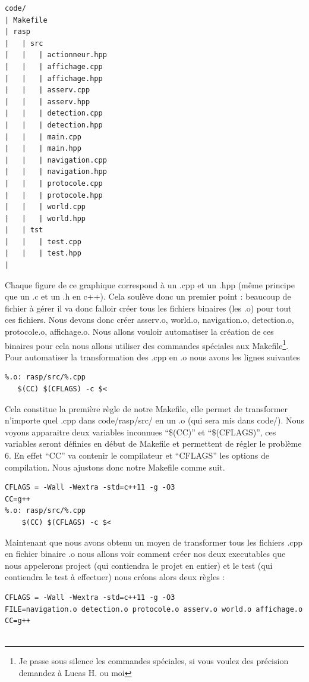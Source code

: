 \documentclass[a4paper,10pt]{article}
\begin{document}
\begin{spacing}{1.5}
\begin{multicols}{2}
  \columnbreak
\begin{verbatim}
code/
| Makefile
| rasp
|   | src
|   |   | actionneur.hpp
|   |   | affichage.cpp
|   |   | affichage.hpp
|   |   | asserv.cpp
|   |   | asserv.hpp
|   |   | detection.cpp
|   |   | detection.hpp
|   |   | main.cpp
|   |   | main.hpp
|   |   | navigation.cpp
|   |   | navigation.hpp
|   |   | protocole.cpp
|   |   | protocole.hpp
|   |   | world.cpp
|   |   | world.hpp
|   | tst
|   |   | test.cpp
|   |   | test.hpp
|
\end{verbatim}
\end{multicols}
Chaque figure de ce graphique correspond à un .cpp et un .hpp (même principe que
un .c et un .h en c++). Cela soulève donc un premier point : beaucoup de fichier
à gérer il va donc falloir créer tous les fichiers binaires (les .o) pour tout
ces fichiers. Nous devons donc créer asserv.o, world.o, navigation.o,
detection.o, protocole.o, affichage.o. Nous allons vouloir automatiser la
création de ces binaires pour cela nous allons utiliser des commandes spéciales
aux Makefile\footnote{Je passe sous silence les commandes spéciales, si vous
  voulez des précision demandez à Lucas H. ou moi}. Pour automatiser la
transformation des .cpp en .o nous avons les lignes suivantes
\begin{lstlisting}
%.o: rasp/src/%.cpp
   $(CC) $(CFLAGS) -c $<
\end{lstlisting}

Cela constitue la première règle de notre Makefile, elle permet de transformer
n'importe quel .cpp dans code/rasp/src/ en un .o (qui sera mis dans code/).
Nous voyons apparaitre deux variables inconnues ``\$(CC)'' et ``\$(CFLAGS)'', ces
variables seront définies en début de Makefile et permettent de régler le
problème 6. En effet ``CC'' va contenir le compilateur et ``CFLAGS'' les options
de compilation. Nous ajustons donc notre Makefile comme suit.
\begin{lstlisting}
CFLAGS = -Wall -Wextra -std=c++11 -g -O3
CC=g++
%.o: rasp/src/%.cpp
	$(CC) $(CFLAGS) -c $<
\end{lstlisting}

Maintenant que nous avons obtenu un moyen de transformer tous les fichiers .cpp en
fichier binaire .o nous allons voir comment créer nos deux executables que nous
appelerons project (qui contiendra le projet en entier) et le test (qui
contiendra le test à effectuer) nous créons alors deux règles :

\begin{lstlisting}
CFLAGS = -Wall -Wextra -std=c++11 -g -O3
FILE=navigation.o detection.o protocole.o asserv.o world.o affichage.o
CC=g++


\end{lstlisting}
\end{spacing}
\end{document}

